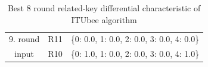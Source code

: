 \begin{table}[ht]
\begin{tabular}{|c|c|c|}
        \hline
        9. round & R11 & \{0: 0.0, 1: 0.0, 2: 0.0, 3: 0.0, 4: 0.0\} \\
        input     & R10 & \{0: 1.0, 1: 0.0, 2: 0.0, 3: 0.0, 4: 1.0\} \\
        \hline
    \end{tabular}
    \caption{Best 8 round related-key differential characteristic of ITUbee algorithm}
    \label{tab:RelatedKeyDif}
\end{table}